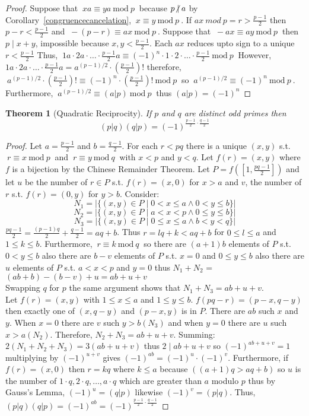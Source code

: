 \documentclass[12pt]{extarticle}
\renewcommand\qedsymbol{$\square$}
\newcommand{\divides}{\mid}
\newcommand{\ndivides}{\centernot \mid}
\newtheorem{theorem}{Theorem}[section]
\newenvironment{lproof}{\begin{proof} \renewcommand{\qedsymbol}{}}{\end{proof}}
\renewcommand{\mod}[3]{\: #1 \equiv #2 \: \mathrm{mod} \: #3 \:}
\begin{document}
\begin{lproof}
Suppose that $\mod{xa}{ya}{p}$ because $p \ndivides a$ by Corollary~\ref{congruencecancelation}, $\mod{x}{y}{p}$. If $ax \: mod \: p = r > \frac{p-1}{2}$ then $p - r < \frac{p-1}{2}$ and $\mod{-(p - r)}{ax}{p}$. Suppose that $\mod{-ax}{ay}{p}$ then $p \divides x+y$, impossible because $x,y < \frac{p-1}{2}$. Each $ax$ reduces upto sign to a unique $r < \frac{p-1}{2}$ Thus, $\mod{1a \cdot 2a \cdot \ldots \cdot \frac{p-1}{2}a}{(-1)^n \cdot 1 \cdot 2 \cdot \ldots \cdot \frac{p-1}{2}}{p}$ However, $1a \cdot 2a \cdot \ldots \cdot \frac{p-1}{2}a = a^{(p-1)/2} \cdot (\frac{p-1}{2})!$ therefore, $\mod{a^{(p-1)/2} \cdot (\frac{p-1}{2})!}{(-1)^n \cdot (\frac{p-1}{2})!}{p}$ so $\mod{a^{(p-1)/2}}{(-1)^n}{p}$. Furthermore, $\mod{a^{(p-1)/2}}{(a|p)}{p}$ thus $(a|p) = (-1)^n$
\end{lproof}

\begin{theorem}[Quadratic Reciprocity]
If $p$ and $q$ are distinct odd primes then \[(p|q)(q|p) = (-1)^{\frac{p-1}{2} \cdot \frac{q-1}{2}}\]
\end{theorem}

\begin{proof}
Let $a = \frac{p-1}{2}$ and $b = \frac{q-1}{2}$. For each $r < pq$ there is a unique $(x,y)$ s.t. $\mod{r}{x}{p}$ and $\mod{r}{y}{q}$ with $x < p$ and $y < q$. Let $f(r) = (x,y)$ where $f$ is a bijection by the Chinese Remainder Theorem. Let $P = f([1,\frac{pq-1}{2}])$ and let $u$ be the number of $r \in P$ s.t. $f(r) = (x,0)$ for $x > a$ and $v$, the number of $r$ s.t. $f(r) = (0,y)$ for $y > b$. 
Consider: \\
\[N_1 = |\{(x,y) \in P \mid 0 < x  \le a \wedge 0 < y \le b\}|\] 
\[N_2 = |\{(x,y) \in P \mid a < x < p \wedge 0 \le y \le b\}|\]  
\[N_3 = |\{(x,y) \in P \mid 0 \le x  \le a \wedge b < y < q\}|\] 
$\frac{pq-1}{2} = \frac{(p-1)q}{2} + \frac{q-1}{2} = aq + b$. Thus $r = lq + k < aq + b$ for $0 \le l \le a$ and $1 \le k \le b$. Furthermore, $\mod{r}{k}{q}$ so there are $(a+1)b$ elements of $P$ s.t. $0 < y \le b$ also there are $b - v$ elements of $P$ s.t. $x = 0$ and $0 \le y \le b$ also there are $u$ elements of $P$ s.t. $a < x < p$ and $y = 0$ thus $N_1 + N_2$ = $(ab + b) - (b - v) + u = ab + u + v$ \\ Swapping $q$ for $p$ the same argument shows that $N_1 + N_3 = ab + u + v$. \\ Let $f(r) = (x,y)$ with $1 \le x  \le a$ and $1 \le y \le b$. $f(pq-r) = (p-x,q-y)$ then exactly one of $(x, q-y)$ and $(p-x, y)$ is in $P$. There are $ab$ such $x$ and $y$. When $x = 0$ there are $v$ such $y > b (N_3)$ and when $y = 0$ there are $u$ such $x > a (N_2)$. Therefore, $N_2 + N_3 = ab + u + v$. Summing: $2(N_1 + N_2 + N_3) = 3(ab + u + v)$ thus $2 \divides ab + u + v$ so $(-1)^{ab + u + v} = 1$    multiplying by $(-1)^{u + v}$ gives $(-1)^{ab} = (-1)^u \cdot (-1)^v$. Furthermore, if $f(r) = (x, 0)$ then $r = kq$ where $k \le a$ because  $((a+1)q > aq + b)$ so $u$ is the number of $1 \cdot q, 2 \cdot q, \dots , a \cdot q$ which are greater than $a$ modulo $p$ thus by Gauss's Lemma, $(-1)^u = (q|p)$ likewise $(-1)^v = (p|q)$. Thus, $(p|q)(q|p) = (-1)^{ab} = (-1)^{\frac{p-1}{2} \cdot \frac{q-1}{2}}$ 
\end{proof}
\end{document}
